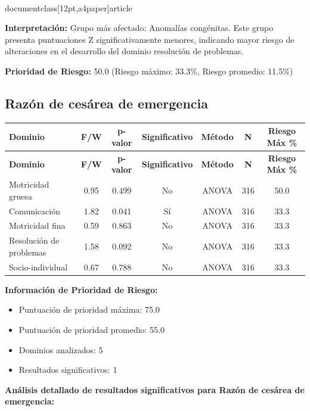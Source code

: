 \\documentclass[12pt,a4paper]{article}
\begin{document}
\textbf{Interpretación:} Grupo más afectado: Anomalías congénitas. Este grupo presenta puntuaciones Z significativamente menores, indicando mayor riesgo de alteraciones en el desarrollo del dominio resolución de problemas.

\textbf{Prioridad de Riesgo:} 50.0 (Riesgo máximo: 33.3\%, Riesgo promedio: 11.5\%)


\vspace{0.5cm}


\subsection{Razón de cesárea de emergencia}


\begin{longtable}{|l|c|c|c|c|c|c|}
\hline
\textbf{Dominio} & \textbf{F/W} & \textbf{p-valor} & \textbf{Significativo} & \textbf{Método} & \textbf{N} & \textbf{Riesgo Máx \%} \\
\hline
\endfirsthead

\hline
\textbf{Dominio} & \textbf{F/W} & \textbf{p-valor} & \textbf{Significativo} & \textbf{Método} & \textbf{N} & \textbf{Riesgo Máx \%} \\
\hline
\endhead

\hline
\endfoot

\hline
\endlastfoot

Motricidad gruesa & 0.95 & 0.499 & No & ANOVA & 316 & 50.0 \\
Comunicación & 1.82 & 0.041 & Sí & ANOVA & 316 & 33.3 \\
Motricidad fina & 0.59 & 0.863 & No & ANOVA & 316 & 33.3 \\
Resolución de problemas & 1.58 & 0.092 & No & ANOVA & 316 & 33.3 \\
Socio-individual & 0.67 & 0.788 & No & ANOVA & 316 & 33.3 \\

\end{longtable}


\textbf{Información de Prioridad de Riesgo:}
\begin{itemize}
\item Puntuación de prioridad máxima: 75.0
\item Puntuación de prioridad promedio: 55.0
\item Dominios analizados: 5
\item Resultados significativos: 1
\end{itemize}


\textbf{Análisis detallado de resultados significativos para Razón de cesárea de emergencia:}
\end{document}
